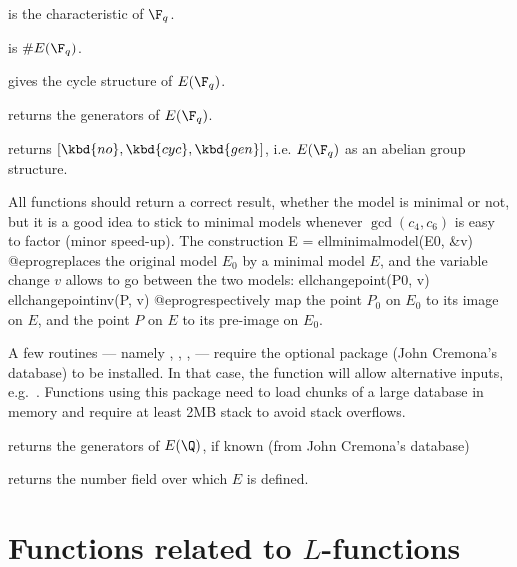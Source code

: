 
\item {} is the characteristic of $\F_q$.

\item {} is $\#E(\F_q)$.

\item {} gives the cycle structure of $E(\F_q)$.

\item {} returns the generators of $E(\F_q)$.

\item {} returns $[\kbd{no},\kbd{cyc},\kbd{gen}]$, i.e. $E(\F_q)$
as an abelian group structure.


All functions should return a correct result, whether the model is minimal or
not, but it is a good idea to stick to minimal models whenever
$\gcd(c_4,c_6)$ is easy to factor (minor speed-up). The construction
\bprog
  E = ellminimalmodel(E0, &v)
@eprog\noindent replaces the original model $E_0$ by a minimal model $E$,
and the variable change $v$ allows to go between the two models:
\bprog
  ellchangepoint(P0, v)
  ellchangepointinv(P, v)
@eprog\noindent respectively map the point $P_0$ on $E_0$ to its image on
$E$, and the point $P$ on $E$ to its pre-image on $E_0$.

A few routines --- namely , ,
,  --- require the optional package 
(John Cremona's database) to be installed. In that case, the function
 will allow alternative inputs, e.g.~.
Functions using this package need to load chunks of a large database in
memory and require at least 2MB stack to avoid stack overflows.

\item {} returns the generators of $E(\Q)$, if known (from John
  Cremona's database)


\item {} returns the number field over which $E$ is defined.


\section{Functions related to $L$-functions}

